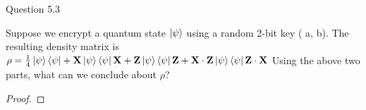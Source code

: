 \begin{solution}{Question 5.3}\label{ques:5.3}
    \begin{question}
    Suppose we encrypt a quantum state $\ket{\psi}$ using a random 2-bit key ( a, b). The resulting density matrix is\\
$ \rho = \frac{1}{4} \ket{\psi}\bra{\psi}+\mathbf{X}\ket{\psi}\bra{\psi}\mathbf{X}+\mathbf{Z}\ket{\psi}\bra{\psi}\mathbf{Z}+\mathbf{X}\cdot\mathbf{Z}\ket{\psi}\bra{\psi}\mathbf{Z}\cdot\mathbf{X}$
Using the above two parts, what can we conclude about $\rho$?
    \end{question}
    \tcblower{}
    \begin{proof}
    \end{proof}
\end{solution}
